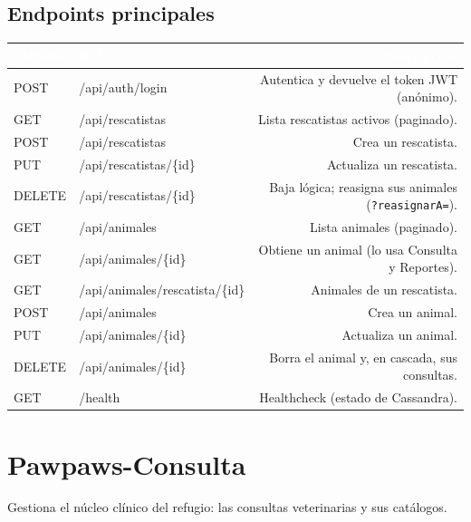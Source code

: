 \documentclass[11pt,a4paper]{article}
\begin{document}
\subsection{Endpoints principales}
\begin{center}
\begin{longtable}{M P D}
\textcolor{white}{\textbf{Método}} & \textcolor{white}{\textbf{Ruta}} & \textcolor{white}{\textbf{Descripción}} \\
\midrule \endhead
POST   & /api/auth/login            & Autentica y devuelve el token JWT (anónimo). \\
GET    & /api/rescatistas           & Lista rescatistas activos (paginado). \\
POST   & /api/rescatistas           & Crea un rescatista. \\
PUT    & /api/rescatistas/\{id\}      & Actualiza un rescatista. \\
DELETE & /api/rescatistas/\{id\}      & Baja lógica; reasigna sus animales (\texttt{?reasignarA=}). \\
GET    & /api/animales              & Lista animales (paginado). \\
GET    & /api/animales/\{id\}         & Obtiene un animal (lo usa Consulta y Reportes). \\
GET    & /api/animales/rescatista/\{id\} & Animales de un rescatista. \\
POST   & /api/animales             & Crea un animal. \\
PUT    & /api/animales/\{id\}        & Actualiza un animal. \\
DELETE & /api/animales/\{id\}        & Borra el animal y, en cascada, sus consultas. \\
GET    & /health                   & Healthcheck (estado de Cassandra). \\
\end{longtable}
\end{center}

\section{Pawpaws-Consulta}

Gestiona el núcleo clínico del refugio: las consultas veterinarias y sus catálogos.
\end{document}

